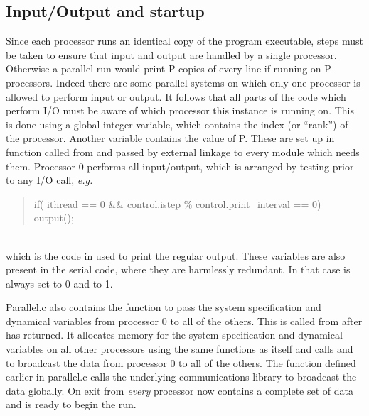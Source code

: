 \documentclass[a4paper,twoside]{report}
\newcommand{\Fname}[1]{{\upshape\mdseries\sffamily#1}}
\newcommand{\Litf}{\ttfamily\upshape\mdseries}
\newcommand{\eg}{\emph{e.g.}}
\begin{document}
\subsection{Input/Output and startup}
\label{sec:pario}

Since each processor runs an identical copy of the program executable,
steps must be taken to ensure that input and output are handled by a
single processor.  Otherwise a parallel run would print P copies of
every line if running on P processors.  Indeed there are some parallel
systems on which only one processor is allowed to perform input or
output. It follows that all parts of the code which perform I/O must
be aware of which processor this instance is running on.  This is done
using a global integer variable,  which contains
the index (or ``rank'') of the processor.  Another variable
 contains the value of P.  These are set up in
function  called from  and passed
by external linkage to every module which needs them.  Processor 0
performs all input/output, which is arranged by testing
 prior to any I/O call, \eg\\
\parbox{\textwidth}{%
\begin{quote}
  \Litf
      if( ithread == 0 \&\& control.istep \% control.print\_interval == 0)\\
\hspace*{1cm}          output();
\end{quote}}\\
which is the code in  used to print the regular output.
These variables are also present in the serial code, where they are
harmlessly redundant. In that case  is always set to 0
and  to 1.

\Fname{Parallel.c} also contains the function  to
pass the system specification and dynamical variables from processor 0
to all of the others.  This is called from  after
 has returned.  It allocates memory for the system
specification and dynamical variables on all other processors using
the same functions as  itself and calls
 and  to broadcast the
data from processor 0 to all of the others.  The function
 defined earlier in \Fname{parallel.c}
calls the underlying communications library to broadcast the
data globally.  On exit from  \emph{every}
processor now contains a complete set of data and is ready to begin
the run.
\end{document}
